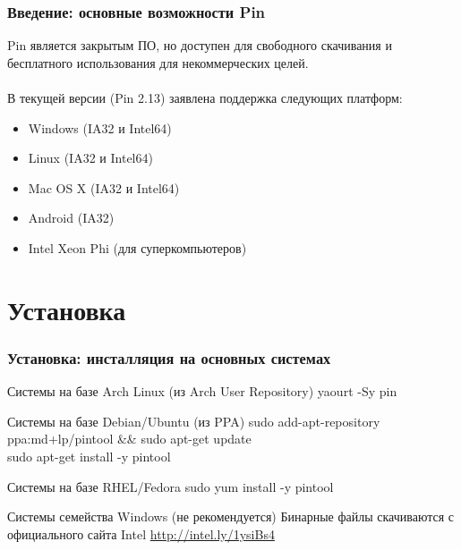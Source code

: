 \documentclass{beamer}
\begin{document}
\begin{frame}
\frametitle{Введение: основные возможности Pin}
Pin является закрытым ПО, но доступен для свободного скачивания и бесплатного использования для некоммерческих целей.\\~\\

В текущей версии (Pin 2.13) заявлена поддержка следующих платформ:
\begin{itemize}
\item Windows (IA32 и Intel64)
\item Linux (IA32 и Intel64)
\item Mac OS X (IA32 и Intel64)
\item Android (IA32)
\item Intel Xeon Phi (для суперкомпьютеров)
\end{itemize}
\end{frame}

\section{Установка}

\begin{frame}
\frametitle{Установка: инсталляция на основных системах}
\begin{block}{Системы на базе Arch Linux (из Arch User Repository)}
yaourt -Sy pin

\end{block}

\begin{block}{Системы на базе Debian/Ubuntu (из PPA)}
sudo add-apt-repository ppa:md+lp/pintool \&\& sudo apt-get update\\
sudo apt-get install -y pintool
\end{block}

\begin{block}{Системы на базе RHEL/Fedora}
sudo yum install -y pintool
\end{block}

\begin{block}{Системы семейства Windows (не рекомендуется)}
Бинарные файлы скачиваются с официального сайта Intel \url{http://intel.ly/1ysiBs4}
\end{block}
\end{frame}

\end{document}
